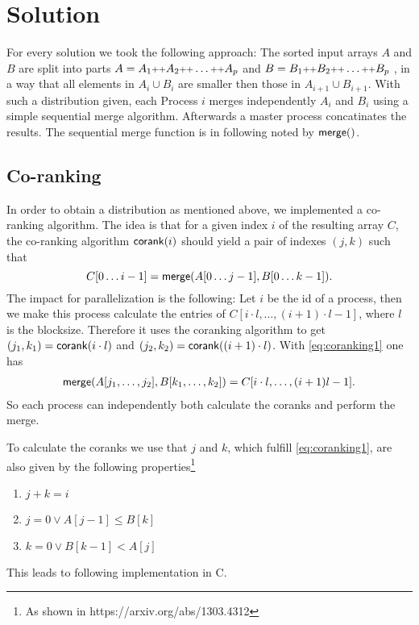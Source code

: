\section{Solution}
For every solution we took the following approach:
The sorted input arrays $A$ and $B$ are split into parts
$A = A_1 \concat A_2 \concat \ldots \concat A_p$  and
$B = B_1 \concat B_2 \concat \ldots \concat B_p$
, in a way that all elements in $A_i \cup B_i$ are smaller then those in $A_{i+1} \cup B_{i+1}$. 
With such a distribution given, each Process $i$ merges independently $A_i$ and $B_i$ using a simple sequential merge algorithm.
Afterwards a master process concatinates the results.
The sequential merge function is in following noted by $\merge()$.

\subsection{Co-ranking}
In order to obtain a distribution as mentioned above, we implemented a co-ranking algorithm.
The idea is that for a given index $i$ of the resulting array $C$, 
the co-ranking algorithm $\corank(i)$ should yield a pair of indexes $(j,k)$
such that
\begin{equation}\label{eq:coranking1}
  C[0\ldots i-1] = \merge(A[0\ldots j-1],B[0\ldots k-1]).
\end{equation}
The impact for parallelization is the following:
Let $i$ be the id of a process,
then we make this process calculate the entries of $C[i \cdot l, \ldots, (i+1)\cdot l - 1]$,
where $l$ is the blocksize.
Therefore it uses the coranking algorithm to get
$(j_1,k_1) = \corank(i\cdot l)$ and $(j_2,k_2) = \corank((i+1)\cdot l)$.
With \eqref{eq:coranking1} one has
\begin{align*}
  \merge(A[j_1,\ldots,j_2],B[k_1,\ldots,k_2]) = C[i \cdot l,\ldots, (i+1)l - 1].
\end{align*}
So each process can independently both calculate the coranks and perform the merge.

To calculate the coranks we use that
$j$ and $k$, which fulfill \eqref{eq:coranking1}, are also given by the following
properties\footnote{As shown in https://arxiv.org/abs/1303.4312}
\begin{enumerate}
  \item $j + k = i$
  \item $j = 0 \vee A[j-1] \leq B[k]$
  \item $k = 0 \vee B[k-1] < A[j]$
\end{enumerate}
This leads to following implementation in C.



